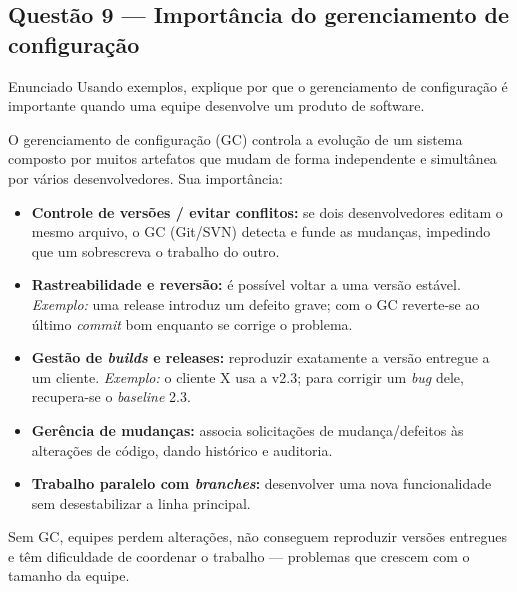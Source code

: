 \documentclass[11pt,a4paper]{article}
\begin{document}
\subsection*{Questão 9 — Importância do gerenciamento de configuração}
\begin{questao}{Enunciado}
Usando exemplos, explique por que o gerenciamento de configuração é importante
quando uma equipe desenvolve um produto de software.
\end{questao}
\begin{resposta}
O gerenciamento de configuração (GC) controla a evolução de um sistema composto
por muitos artefatos que mudam de forma independente e simultânea por vários
desenvolvedores. Sua importância:
\begin{itemize}[nosep]
  \item \textbf{Controle de versões / evitar conflitos:} se dois desenvolvedores
        editam o mesmo arquivo, o GC (Git/SVN) detecta e funde as mudanças,
        impedindo que um sobrescreva o trabalho do outro.
  \item \textbf{Rastreabilidade e reversão:} é possível voltar a uma versão
        estável. \emph{Exemplo:} uma release introduz um defeito grave; com o GC
        reverte-se ao último \emph{commit} bom enquanto se corrige o problema.
  \item \textbf{Gestão de \emph{builds} e releases:} reproduzir exatamente a
        versão entregue a um cliente. \emph{Exemplo:} o cliente X usa a v2.3;
        para corrigir um \emph{bug} dele, recupera-se o \emph{baseline} 2.3.
  \item \textbf{Gerência de mudanças:} associa solicitações de mudança/defeitos
        às alterações de código, dando histórico e auditoria.
  \item \textbf{Trabalho paralelo com \emph{branches}:} desenvolver uma nova
        funcionalidade sem desestabilizar a linha principal.
\end{itemize}
Sem GC, equipes perdem alterações, não conseguem reproduzir versões entregues e
têm dificuldade de coordenar o trabalho — problemas que crescem com o tamanho da
equipe.
\end{resposta}

\end{document}
